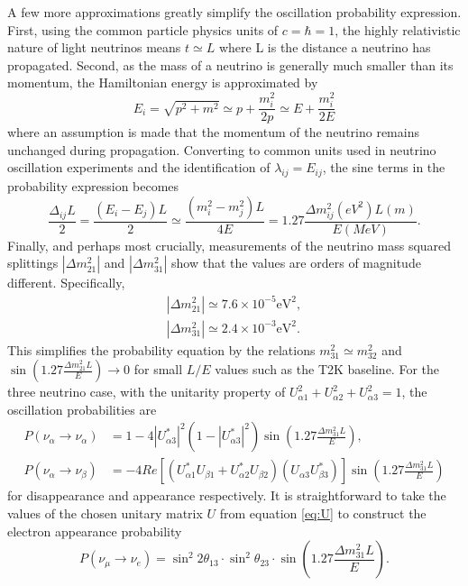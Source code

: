A few more approximations greatly simplify the oscillation probability expression. First, using the common particle physics units of $c=\hbar=1$, the highly relativistic nature of light neutrinos means $t \simeq L$ where L is the distance a neutrino has propagated. Second, as the mass of a neutrino is generally much smaller than its momentum, the Hamiltonian energy is approximated by
\begin{equation}
E_i=\sqrt{p^2+m^2}\simeq p+\frac{m_i^2}{2p}\simeq E+\frac{m_i^2}{2E}
\end{equation}
where an assumption is made that the momentum of the neutrino remains unchanged during propagation. Converting to common units used in neutrino oscillation experiments and the identification of $\lambda_{ij} = E_{ij}$, the sine terms in the probability expression becomes 
\begin{equation}
\frac{\Delta_{ij}L}{2} = \frac{(E_i-E_j)L}{2} \simeq \frac{(m_i^2-m_j^2) L}{4E} = 1.27 \frac{\Delta m^2_{ij}(eV^2) L(m)}{E(MeV)}.
\end{equation}
Finally, and perhaps most crucially, measurements of the neutrino mass squared splittings $|\Delta m^2_{21}|$ and $|\Delta m^2_{31}|$ show that the values are orders of magnitude different. Specifically,
\begin{align}
|\Delta m^2_{21}| \simeq 7.6\times 10^{-5}\text{eV}^2,\\
|\Delta m^2_{31}| \simeq 2.4\times 10^{-3}\text{eV}^2.
\end{align}
This simplifies the probability equation by the relations $m^2_{31} \simeq m^2_{32}$ and $\sin\left(1.27 \frac{\Delta m^2_{21}L}{E}\right)\rightarrow 0$ for small $L/E$ values such as the T2K baseline. For the three neutrino case, with the unitarity property of $U_{\alpha 1}^2 + U_{\alpha 2}^2 + U_{\alpha 3}^2 = 1$, the oscillation probabilities are
\begin{align}
P(\nu_\alpha\rightarrow\nu_\alpha) &= 1-4 |U^*_{\alpha 3}|^2(1-|U^*_{\alpha 3}|^2) \sin\left(1.27 \frac{\Delta m^2_{31}L}{E}\right), \\
P(\nu_\alpha\rightarrow\nu_\beta) &= -4 Re[(U^*_{\alpha 1}U_{\beta 1}+U^*_{\alpha 2}U_{\beta 2})(U_{\alpha 3}U^*_{\beta 3})]\sin\left(1.27 \frac{\Delta m^2_{31}L}{E}\right)
\end{align}
for disappearance and appearance respectively. It is straightforward to take the values of the chosen unitary matrix $U$ from  equation \ref{eq:U} to construct the electron appearance probability
\begin{equation}
P(\nu_\mu\rightarrow\nu_e) = \sin^2 2\theta_{13} \cdot \sin^2 \theta_{23} \cdot \sin\left(1.27 \frac{\Delta m^2_{31}L}{E}\right).
\end{equation}
